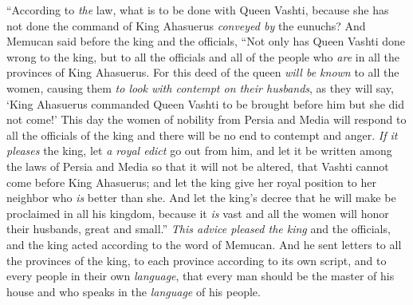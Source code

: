\begin{biblechapter}
\verse “According to \textit{the} law, what is to be done with Queen Vashti, because she has not done the command of King Ahasuerus \textit{conveyed by} the eunuchs?
\verse And Memucan said before the king and the officials, “Not only has Queen Vashti done wrong to the king, but to all the officials and all of the people who \textit{are} in all the provinces of King Ahasuerus.
\verse For this deed of the queen \textit{will be known} to all the women, causing them \textit{to look with contempt on their husbands}, as they will say, ‘King Ahasuerus commanded Queen Vashti to be brought before him but she did not come!’
\verse This day the women of nobility from Persia and Media will respond to all the officials of the king and there will be no end to contempt and anger.
\verse \textit{If it pleases} the king, let \textit{a royal edict} go out from him, and let it be written among the laws of Persia and Media so that it will not be altered, that Vashti cannot come before King Ahasuerus; and let the king give her royal position to her neighbor who \textit{is} better than she.
\verse And let the king’s decree that he will make be proclaimed in all his kingdom, because it \textit{is} vast and all the women will honor their husbands, great and small.”
\verse \textit{This advice pleased the king} and the officials, and the king acted according to the word of Memucan.
\verse And he sent letters to all the provinces of the king, to each province according to its own script, and to every people in their own \textit{language}, that every man should be the master of his house and who speaks in the \textit{language} of his people.
\end{biblechapter}

